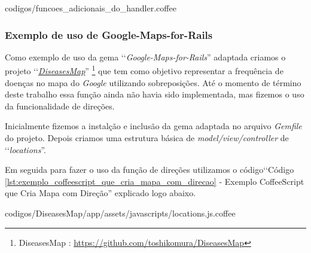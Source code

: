 
{codigos/funcoes_adicionais_do_handler.coffee}

\subsubsection{Exemplo de uso de Google-Maps-for-Rails}
\label{subsubsection:exemplo_de_uso_de_google-maps-for-rails}

Como exemplo de uso da gema ‘‘\emph{Google-Maps-for-Rails}'' adaptada criamos o projeto 
‘‘\emph{\href{https://github.com/toshikomura/DiseasesMap}{DiseasesMap}}'' 
\footnote{DiseasesMap : \url{https://github.com/toshikomura/DiseasesMap}} que tem como objetivo representar 
a frequência de doenças no mapa do \emph{Google} utilizando sobreposições. Até o momento de término deste
trabalho essa função ainda não havia sido implementada, mas fizemos o uso da funcionalidade de direções.

Inicialmente fizemos a instalção e inclusão da gema adaptada no arquivo \emph{Gemfile} do projeto. Depois 
criamos uma estrutura básica de \emph{model/view/controller} de ‘‘\emph{locations}''. 

Em seguida para fazer o uso da função de direções utilizamos o código‘‘Código 
\ref{lst:exemplo_coffeescript_que_cria_mapa_com_direcao} - Exemplo CoffeeScript que Cria Mapa com 
Direção'' explicado logo abaixo.


{codigos/DiseasesMap/app/assets/javascripts/locations.js.coffee}


